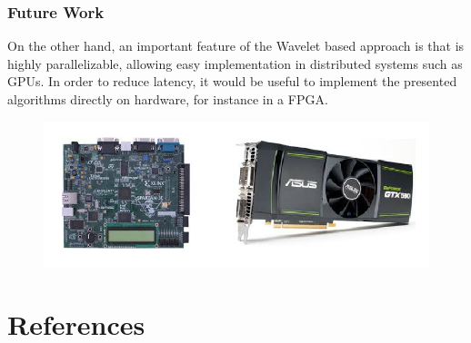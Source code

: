 \documentclass{beamer}
\begin{document}
\begin{frame}
\frametitle{Future Work}
On the other hand, an important feature of the Wavelet based approach is that is highly parallelizable, allowing easy implementation in distributed systems such as GPUs. In order to reduce latency, it would be useful to implement the presented algorithms directly on hardware, for instance in a FPGA.

\begin{figure}
	\centering
		\includegraphics[scale=0.5]{futureWork2.png}
	\label{fig:futureWork2}
\end{figure}

\end{frame}

\section{References}
\end{document}
